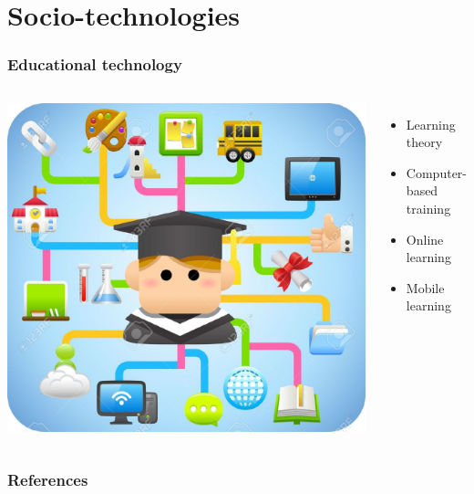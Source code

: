 \documentclass{beamer}
\begin{document}
\section{Socio-technologies}
\begin{frame}
	\frametitle{Educational technology}
	\begin{columns}
		\includegraphics[scale=.5]{EdTech_main}
		\begin{itemize}
			\item Learning theory
			\item Computer-based training
			\item Online learning
			\item Mobile learning
		\end{itemize}
	\end{columns}
\end{frame}

\begin{frame}
	\frametitle{References}
	\nocite{*}
	
	
\end{frame}
\end{document}
